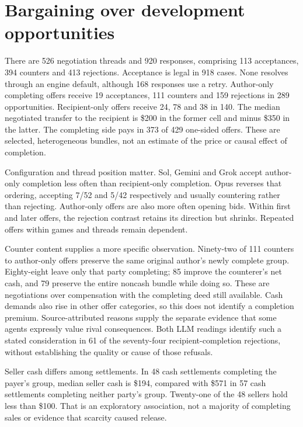 \section{Bargaining over development opportunities}

There are 526 negotiation threads and 920 responses, comprising 113 acceptances, 394 counters and 413 rejections. Acceptance is legal in 918 cases. None resolves through an engine default, although 168 responses use a retry. Author-only completing offers receive 19 acceptances, 111 counters and 159 rejections in 289 opportunities. Recipient-only offers receive 24, 78 and 38 in 140. The median negotiated transfer to the recipient is \$200 in the former cell and minus \$350 in the latter. The completing side pays in 373 of 429 one-sided offers. These are selected, heterogeneous bundles, not an estimate of the price or causal effect of completion.

Configuration and thread position matter. Sol, Gemini and Grok accept author-only completion less often than recipient-only completion. Opus reverses that ordering, accepting 7/52 and 5/42 respectively and usually countering rather than rejecting. Author-only offers are also more often opening bids. Within first and later offers, the rejection contrast retains its direction but shrinks. Repeated offers within games and threads remain dependent.

Counter content supplies a more specific observation. Ninety-two of 111 counters to author-only offers preserve the same original author's newly complete group. Eighty-eight leave only that party completing; 85 improve the counterer's net cash, and 79 preserve the entire noncash bundle while doing so. These are negotiations over compensation with the completing deed still available. Cash demands also rise in other offer categories, so this does not identify a completion premium. Source-attributed reasons supply the separate evidence that some agents expressly value rival consequences. Both LLM readings identify such a stated consideration in 61 of the seventy-four recipient-completion rejections, without establishing the quality or cause of those refusals.

Seller cash differs among settlements. In 48 cash settlements completing the payer's group, median seller cash is \$194, compared with \$571 in 57 cash settlements completing neither party's group. Twenty-one of the 48 sellers hold less than \$100. That is an exploratory association, not a majority of completing sales or evidence that scarcity caused release.

